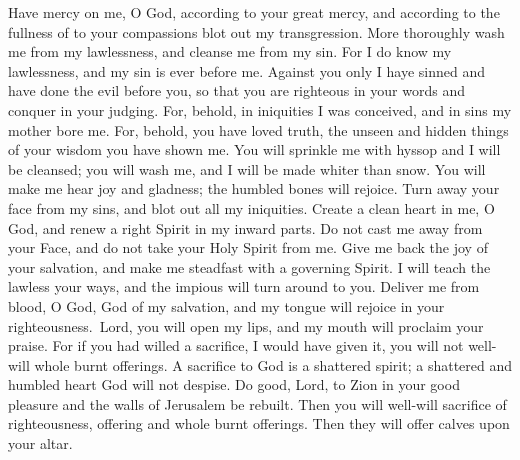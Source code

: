 \noindent{}Have mercy on me, O God, according to your great mercy, and according to the fullness of to your compassions blot out my transgression. More thoroughly wash me from my lawlessness, and cleanse me from my sin. For I do know my lawlessness, and my sin is ever before me. Against you only I haye sinned and have done the evil before you, so that you are righteous in your words and conquer in your judging. For, behold, in iniquities I was conceived, and in sins my mother bore me. For, behold, you have loved truth, the unseen and hidden things of your wisdom you have shown me. You will sprinkle me with hyssop and I will be cleansed; you will wash me, and I will be made whiter than snow. You will make me hear joy and gladness; the humbled bones will rejoice. Turn away your face from my sins, and blot out all my iniquities. Create a clean heart in me, O God, and renew a right Spirit in my inward parts. Do not cast me away from your Face, and do not take your Holy Spirit from me. Give me back the joy of your salvation, and make me steadfast with a governing Spirit. I will teach the lawless your ways, and the impious will turn around to you. Deliver me from blood, O God, God of my salvation, and my tongue will rejoice in your righteousness. Lord, you will open my lips, and my mouth will proclaim your praise. For if you had willed a sacrifice, I would have given it, you will not well-will whole burnt offerings. A sacrifice to God is a shattered spirit; a shattered and humbled heart God will not despise. Do good, Lord, to Zion in your good pleasure and the walls of Jerusalem be rebuilt. Then you will well-will sacrifice of righteousness, offering and whole burnt offerings. Then they will offer calves upon your altar.